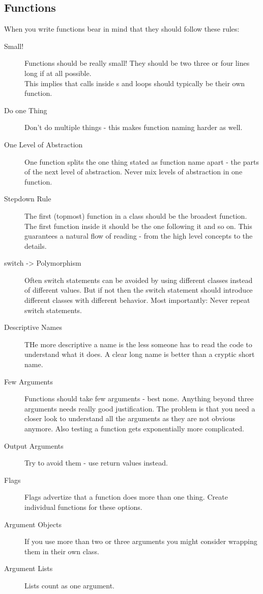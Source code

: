 \documentclass[a4paper, twocolumn]{article}
\newcommand{\code}[1]{\texttt{\color{black}{#1}}}
\begin{document}
\subsection{Functions}
When you write functions bear in mind that they should follow these rules:
\begin{description}
	\item[Small!] Functions should be really small! They should be two three or four lines long if at all possible.\\
		This implies that calls inside \code{if}s and loops should typically be their own function.
	\item[Do one Thing] Don't do multiple things - this makes function naming harder as well.
	\item[One Level of Abstraction] One function splits the one thing stated as function name apart - the parts of the next level of abstraction. Never mix levels of abstraction in one function.
	\item[Stepdown Rule] The first (topmost) function in a class should be the broadest function. The first function inside it should be the one following it and so on. This guarantees a natural flow of reading - from the high level concepts to the details.
	\item[switch -> Polymorphism] Often switch statements can be avoided by using different classes instead of different values. But if not then the switch statement should introduce different classes with different behavior. Most importantly: Never repeat switch statements.
	\item[Descriptive Names] THe more descriptive a name is the less someone has to read the code to understand what it does. A clear long name is better than a cryptic short name.
	\item[Few Arguments] Functions should take few arguments - best none. Anything beyond three arguments needs really good justification. The problem is that you need a closer look to understand all the arguments as they are not obvious anymore. Also testing a function gets exponentially more complicated.
	\item[Output Arguments] Try to avoid them - use return values instead.
	\item[Flags] Flags advertize that a function does more than one thing. Create individual functions for these options.
	\item[Argument Objects] If you use more than two or three arguments you might consider wrapping them in their own class.
	\item[Argument Lists] Lists count as one argument.

\end{description}
\end{document}
